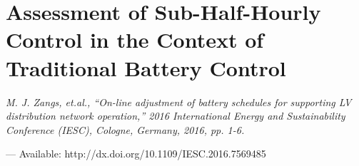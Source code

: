\chapter{Assessment of Sub-Half-Hourly Control in the Context of Traditional Battery Control}
\label{ch1}

\singlespacing
\epigraph{\textit{M. J. Zangs, et.al., ``On-line adjustment of battery schedules for supporting LV distribution network operation,'' 2016 International Energy and Sustainability Conference (IESC), Cologne, Germany, 2016, pp. 1-6.}}{--- Available: http://dx.doi.org/10.1109/IESC.2016.7569485}
\doublespacing


